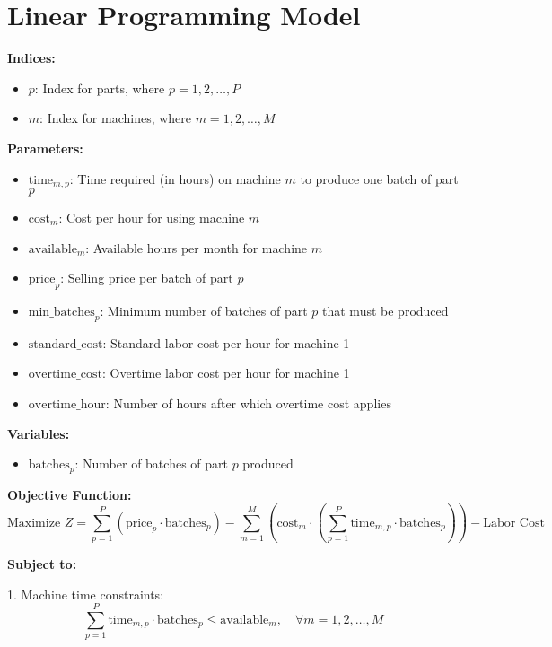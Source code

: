 \documentclass{article}
\begin{document}
\section*{Linear Programming Model}

\textbf{Indices:}
\begin{itemize}
    \item \( p \): Index for parts, where \( p = 1, 2, \ldots, P \)
    \item \( m \): Index for machines, where \( m = 1, 2, \ldots, M \)
\end{itemize}

\textbf{Parameters:}
\begin{itemize}
    \item \( \text{time}_{m,p} \): Time required (in hours) on machine \( m \) to produce one batch of part \( p \)
    \item \( \text{cost}_{m} \): Cost per hour for using machine \( m \)
    \item \( \text{available}_{m} \): Available hours per month for machine \( m \)
    \item \( \text{price}_{p} \): Selling price per batch of part \( p \)
    \item \( \text{min\_batches}_{p} \): Minimum number of batches of part \( p \) that must be produced
    \item \( \text{standard\_cost} \): Standard labor cost per hour for machine 1
    \item \( \text{overtime\_cost} \): Overtime labor cost per hour for machine 1
    \item \( \text{overtime\_hour} \): Number of hours after which overtime cost applies
\end{itemize}

\textbf{Variables:}
\begin{itemize}
    \item \( \text{batches}_{p} \): Number of batches of part \( p \) produced
\end{itemize}

\textbf{Objective Function:}
\[
\text{Maximize } Z = \sum_{p=1}^{P} \left( \text{price}_{p} \cdot \text{batches}_{p} \right) - \sum_{m=1}^{M} \left( \text{cost}_{m} \cdot \left( \sum_{p=1}^{P} \text{time}_{m,p} \cdot \text{batches}_{p} \right) \right) - \text{Labor Cost}
\]

\textbf{Subject to:}

1. Machine time constraints:
\[
\sum_{p=1}^{P} \text{time}_{m,p} \cdot \text{batches}_{p} \leq \text{available}_{m}, \quad \forall m = 1, 2, \ldots, M
\]
\end{document}
